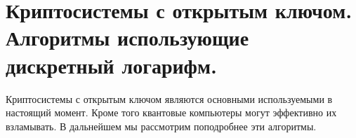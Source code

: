 \chapter{Криптосистемы с открытым ключом. Алгоритмы использующие
  дискретный логарифм.}
Криптосистемы с открытым ключом являются основными используемыми в
настоящий момент. Кроме того квантовые компьютеры могут эффективно их
взламывать. В дальнейшем мы рассмотрим поподробнее эти алгоритмы.




